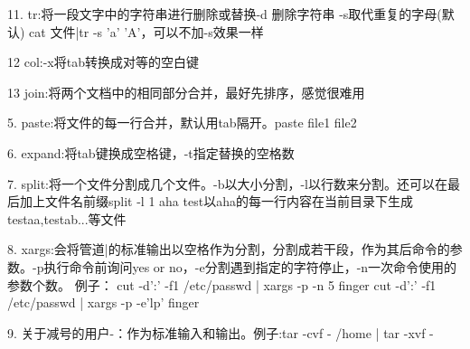\documentclass[a4paper,left=1.5cm,right=1.5cm,11pt]{article}
\begin{document}
	\item[11.]tr:将一段文字中的字符串进行删除或替换-d 删除字符串 -s取代重复的字母(默认) cat 文件|tr -s 'a' 'A'，可以不加-s效果一样
	\item[12]col:-x将tab转换成对等的空白键
	\item[13]join:将两个文档中的相同部分合并，最好先排序，感觉很难用
	\item[5.]paste:将文件的每一行合并，默认用tab隔开。paste file1 file2
	\item[6.]expand:将tab键换成空格键，-t指定替换的空格数
	\item[7.]split:将一个文件分割成几个文件。-b以大小分割，-l以行数来分割。还可以在最后加上文件名前缀split -l 1 aha test以aha的每一行内容在当前目录下生成testaa,testab...等文件
	\item[8.]xargs:会将管道|的标准输出以空格作为分割，分割成若干段，作为其后命令的参数。-p执行命令前询问yes or no，-e分割遇到指定的字符停止，-n一次命令使用的参数个数。
	例子：	cut -d':' -f1 /etc/passwd | xargs -p -n 5 finger
	cut -d':' -f1 /etc/passwd | xargs -p -e'lp' finger
	\item[9.]关于减号的用户-：作为标准输入和输出。例子:tar -cvf - /home | tar -xvf -
\end{document}
